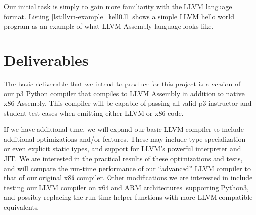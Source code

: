 \documentclass[11pt]{article}
\begin{document}
Our initial task is simply to gain more familiarity with the LLVM language
format. Listing \ref{lst:llvm-example_hell0.ll} shows
a simple LLVM hello world program as an example of
what LLVM Assembly language looks like.



\section{Deliverables}

The basic deliverable that we intend to produce for this project is a
version of our p3 Python compiler that compiles to LLVM Assembly
in addition to native x86 Assembly. This compiler will be capable of
passing all valid p3 instructor and student test cases when emitting either
LLVM or x86 code.

If we have additional time, we will expand our basic LLVM compiler
to include additional optimizations and/or features. These
may include type specialization or even explicit static types, and
support for LLVM's powerful interpreter and JIT.
We are interested in the practical results of these
optimizations and tests, and will compare the run-time performance of
our ``advanced'' LLVM
compiler to that of our original x86 compiler. Other modifications we are interested
in include testing our LLVM compiler on x64 and ARM
architectures, supporting Python3, and possibly replacing the run-time
helper functions with more LLVM-compatible equivalents.

\nocite{*}
\printbibliography
\end{document}
